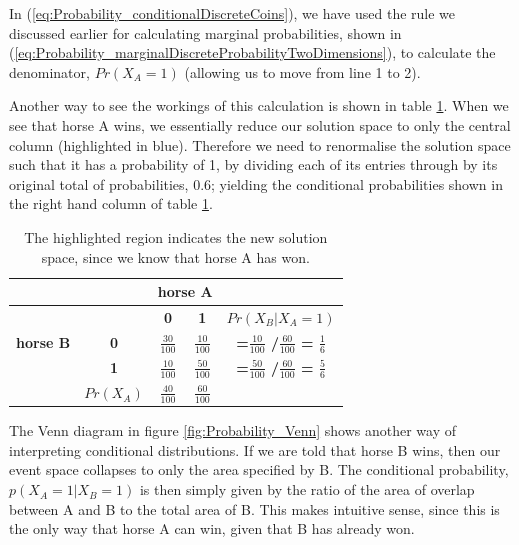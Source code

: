 \documentclass[11pt,fullpage]{book}
\begin{document}
In (\ref{eq:Probability_conditionalDiscreteCoins}), we have used the rule we discussed earlier for calculating marginal probabilities, shown in (\ref{eq:Probability_marginalDiscreteProbabilityTwoDimensions}), to calculate the denominator, $Pr(X_A=1)$ (allowing us to move from line 1 to 2).

Another way to see the workings of this calculation is shown in table \ref{tab:Probability_coinsConditionalDiscrete}. When we see that horse A wins, we essentially reduce our solution space to only the central column (highlighted in blue). Therefore we need to renormalise the solution space such that it has a probability of 1, by dividing each of its entries through by its original total of probabilities, 0.6; yielding the conditional probabilities shown in the right hand column of table \ref{tab:Probability_coinsConditionalDiscrete}.

\begin{table}[htbp]
  \centering
    \begin{tabular}{rrccr}
    \toprule
          &       & \multicolumn{2}{c}{\textbf{horse A}} &  \\
    \midrule
          &       & \textbf{0} & \textbf{1} & \multicolumn{1}{c}{\textbf{$Pr(X_B|X_A=1)$}} \\
    \multicolumn{1}{c}{\textbf{horse B}} & \multicolumn{1}{c}{\textbf{0}} & $\frac{30}{100}$   & {\color{blue}$\frac{10}{100}$ }   & \multicolumn{1}{c}{\textbf{=$\frac{10}{100}$ /$\frac{60}{100}$  = $\frac{1}{6}$ }} \\
    \multicolumn{1}{c}{} & \multicolumn{1}{c}{\textbf{1}} & $\frac{10}{100}$   & {\color{blue}$\frac{50}{100}$ }   & \multicolumn{1}{c}{\textbf{=$\frac{50}{100}$ /$\frac{60}{100}$  = $\frac{5}{6}$ }} \\
          & \multicolumn{1}{c}{\textbf{$Pr(X_A)$}} & \textbf{$\frac{40}{100}$ } & {\color{blue}\textbf{$\frac{60}{100}$ }} & \multicolumn{1}{c}{} \\
    \bottomrule
    \end{tabular}%
\caption{The highlighted region indicates the new solution space, since we know that horse A has won.}
\label{tab:Probability_coinsConditionalDiscrete}
\end{table}

The Venn diagram in figure \ref{fig:Probability_Venn} shows another way of interpreting conditional distributions. If we are told that horse B wins, then our event space collapses to only the area specified by B. The conditional probability, $p(X_A=1|X_B=1)$ is then simply given by the ratio of the area of overlap between A and B to the total area of B. This makes intuitive sense, since this is the only way that horse A can win, given that B has already won.
\end{document}
